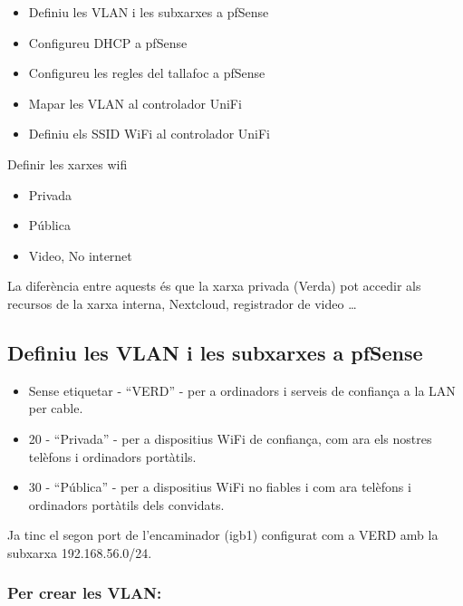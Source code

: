 \documentclass[
  10pt,
]{krantz}
\providecommand{\tightlist}{%
  \setlength{\itemsep}{0pt}\setlength{\parskip}{0pt}}
\begin{document}
\begin{itemize}
\tightlist
\item
  Definiu les VLAN i les subxarxes a pfSense
\item
  Configureu DHCP a pfSense
\item
  Configureu les regles del tallafoc a pfSense
\item
  Mapar les VLAN al controlador UniFi
\item
  Definiu els SSID WiFi al controlador UniFi
\end{itemize}

Definir les xarxes wifi

\begin{itemize}
\tightlist
\item
  Privada
\item
  Pública
\item
  Video, No internet
\end{itemize}

La diferència entre aquests és que la xarxa privada (Verda) pot accedir als recursos de la xarxa interna, Nextcloud, registrador de video \ldots{}

\hypertarget{definiu-les-vlan-i-les-subxarxes-a-pfsense}{%
\subsection{Definiu les VLAN i les subxarxes a pfSense}\label{definiu-les-vlan-i-les-subxarxes-a-pfsense}}

\begin{itemize}
\tightlist
\item
  Sense etiquetar - ``VERD'' - per a ordinadors i serveis de confiança a la LAN per cable.
\item
  20 - ``Privada'' - per a dispositius WiFi de confiança, com ara els nostres telèfons i ordinadors portàtils.
\item
  30 - ``Pública'' - per a dispositius WiFi no fiables i com ara telèfons i ordinadors portàtils dels convidats.
\end{itemize}

Ja tinc el segon port de l'encaminador (igb1) configurat com a VERD amb la subxarxa 192.168.56.0/24.

\hypertarget{per-crear-les-vlan}{%
\subsubsection{Per crear les VLAN:}\label{per-crear-les-vlan}}
\end{document}
